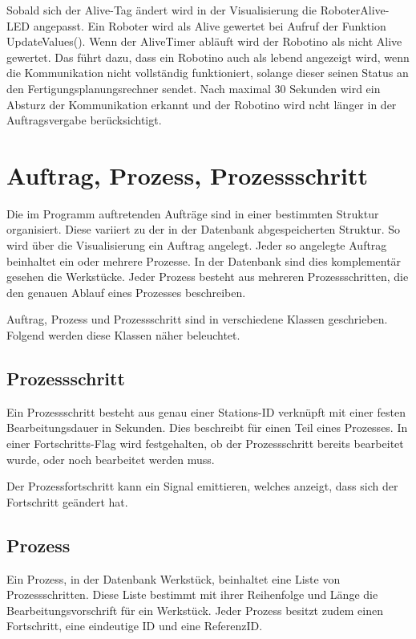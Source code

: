 Sobald sich der Alive-Tag ändert wird in der Visualisierung die RoboterAlive-LED angepasst. Ein Roboter wird als Alive gewertet bei Aufruf der Funktion UpdateValues(). Wenn der AliveTimer abläuft wird der Robotino als nicht Alive gewertet. Das führt dazu, dass ein Robotino auch als lebend angezeigt wird, wenn die Kommunikation nicht vollständig funktioniert, solange dieser seinen Status an den Fertigungsplanungsrechner sendet. Nach maximal 30 Sekunden wird ein Absturz der Kommunikation erkannt und der Robotino wird ncht länger in der Auftragsvergabe berücksichtigt. 

\section{Auftrag, Prozess, Prozessschritt} 
\label{sec:AuftragProzessSchritt}

Die im Programm auftretenden Aufträge sind in einer bestimmten Struktur organisiert. Diese variiert zu der in der Datenbank abgespeicherten Struktur. So wird über die Visualisierung ein Auftrag angelegt. Jeder so angelegte Auftrag beinhaltet ein oder mehrere Prozesse. In der Datenbank sind dies komplementär gesehen die Werkstücke. Jeder Prozess besteht aus mehreren Prozessschritten, die den genauen Ablauf eines Prozesses beschreiben. 

Auftrag, Prozess und Prozessschritt sind in verschiedene Klassen geschrieben. Folgend werden diese Klassen näher beleuchtet. 

\subsection{Prozessschritt}
\label{sec:Prozessschritt}

Ein Prozessschritt besteht aus genau einer Stations-ID verknüpft mit einer festen Bearbeitungsdauer in Sekunden. Dies beschreibt für einen Teil eines Prozesses. In einer Fortschritts-Flag wird festgehalten, ob der Prozessschritt bereits bearbeitet wurde, oder noch bearbeitet werden muss. 

Der Prozessfortschritt kann ein Signal emittieren, welches anzeigt, dass sich der Fortschritt geändert hat.

\subsection{Prozess}
\label{sec:Prozess}

Ein Prozess, in der Datenbank Werkstück, beinhaltet eine Liste von Prozessschritten. Diese Liste bestimmt mit ihrer Reihenfolge und Länge die Bearbeitungsvorschrift für ein Werkstück. Jeder Prozess besitzt zudem einen Fortschritt, eine eindeutige ID und eine ReferenzID. 

